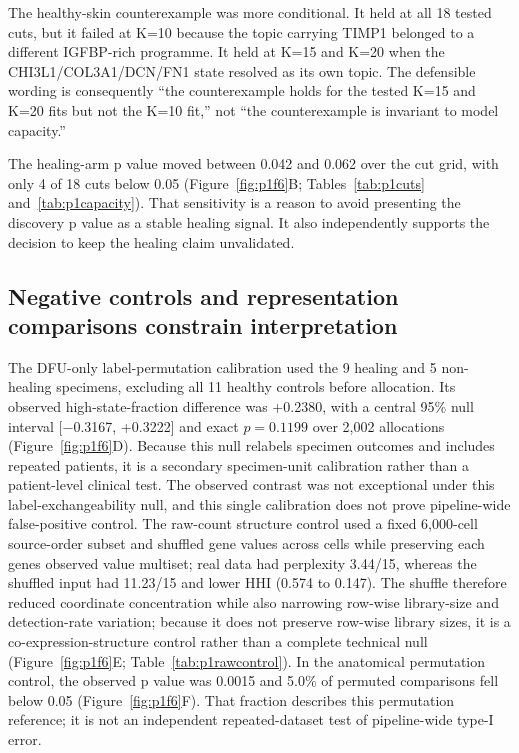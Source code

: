 \documentclass[10pt,a4paper]{article}
\begin{document}
The healthy-skin counterexample was more conditional. It held at all 18 tested cuts, but it failed at K=10 because the topic carrying TIMP1 belonged to a different IGFBP-rich programme. It held at K=15 and K=20 when the CHI3L1/COL3A1/DCN/FN1 state resolved as its own topic. The defensible wording is consequently ``the counterexample holds for the tested K=15 and K=20 fits but not the K=10 fit,'' not ``the counterexample is invariant to model capacity.''

The healing-arm p value moved between 0.042 and 0.062 over the cut grid, with only 4 of 18 cuts below 0.05 (Figure~\ref{fig:p1f6}B; Tables~\ref{tab:p1cuts} and~\ref{tab:p1capacity}). That sensitivity is a reason to avoid presenting the discovery p value as a stable healing signal. It also independently supports the decision to keep the healing claim unvalidated.

\subsection{Negative controls and representation comparisons constrain interpretation}

The DFU-only label-permutation calibration used the 9 healing and 5 non-healing specimens, excluding all 11 healthy controls before allocation. Its observed high-state-fraction difference was +0.2380, with a central 95\% null interval {[}−0.3167, +0.3222{]} and exact $p=0.1199$ over 2,002 allocations (Figure~\ref{fig:p1f6}D). Because this null relabels specimen outcomes and includes repeated patients, it is a secondary specimen-unit calibration rather than a patient-level clinical test. The observed contrast was not exceptional under this label-exchangeability null, and this single calibration does not prove pipeline-wide false-positive control. The raw-count structure control used a fixed 6,000-cell source-order subset and shuffled gene values across cells while preserving each gene\textquotesingle{}s observed value multiset; real data had perplexity 3.44/15, whereas the shuffled input had 11.23/15 and lower HHI (0.574 to 0.147). The shuffle therefore reduced coordinate concentration while also narrowing row-wise library-size and detection-rate variation; because it does not preserve row-wise library sizes, it is a co-expression-structure control rather than a complete technical null (Figure~\ref{fig:p1f6}E; Table~\ref{tab:p1rawcontrol}). In the anatomical permutation control, the observed p value was 0.0015 and 5.0\% of permuted comparisons fell below 0.05 (Figure~\ref{fig:p1f6}F). That fraction describes this permutation reference; it is not an independent repeated-dataset test of pipeline-wide type-I error.
\end{document}
